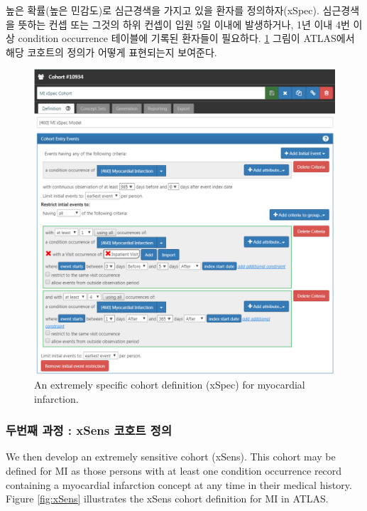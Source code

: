 \documentclass[11pt]{book}
\theoremstyle{definition}
\theoremstyle{definition}
\theoremstyle{definition}
\theoremstyle{remark}
\begin{document}
높은 확률(높은 민감도)로 심근경색을 가지고 있을 환자를 정의하자(xSpec).
심근경색을 뜻하는 컨셉 또는 그것의 하위 컨셉이 입원 5일 이내에
발생하거나, 1년 이내 4번 이상 condition occurrence 테이블에 기록된
환자들이 필요하다. \ref{fig:xSpec} 그림이 ATLAS에서 해당 코호트의 정의가
어떻게 표현되는지 보여준다. 

\begin{figure}

{\centering \includegraphics[width=1\linewidth]{images/ClinicalValidity/xSpec} 

}

\caption{An extremely specific cohort definition (xSpec) for myocardial infarction.}\label{fig:xSpec}
\end{figure}

\subsubsection*{두번째 과정 : xSens 코호트 정의}\label{--xsens--}

We then develop an extremely sensitive cohort (xSens). This cohort may
be defined for MI as those persons with at least one condition
occurrence record containing a myocardial infarction concept at any time
in their medical history. Figure \ref{fig:xSens} illustrates the xSens
cohort definition for MI in ATLAS. 
\end{document}
